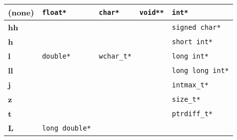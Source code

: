\begin{center}
\tabletail{\hline}
\tablelasttail{\hline}
\footnotesize
{
\begin{xtabular}[!]{|C{.2\columnwidth}|C{.2\columnwidth}|C{.15\columnwidth}|C{.15\columnwidth}|C{.3\columnwidth}|}
\textbf{(none)}  & \texttt{float*}       & \texttt{char*}     & \texttt{void**} & \texttt{int*}             \\ \hline
\textbf{hh}      &                       &                    &                 & \texttt{signed char*}     \\ \hline
\textbf{h}       &                       &                    &                 & \texttt{short int*}       \\ \hline
\textbf{l}       & \texttt{double*}      & \texttt{wchar\_t*} &                 & \texttt{long int*}        \\ \hline
\textbf{ll}      &                       &                    &                 & \texttt{long long int*}   \\ \hline
\textbf{j}       &                       &                    &                 & \texttt{intmax\_t*}       \\ \hline
\textbf{z}       &                       &                    &                 & \texttt{size\_t*}         \\ \hline
\textbf{t}       &                       &                    &                 & \texttt{ptrdiff\_t*}      \\ \hline
\textbf{L}       & \texttt{long double*} &                    &                 &                           \\ 
\end{xtabular}
}

\end{center}
